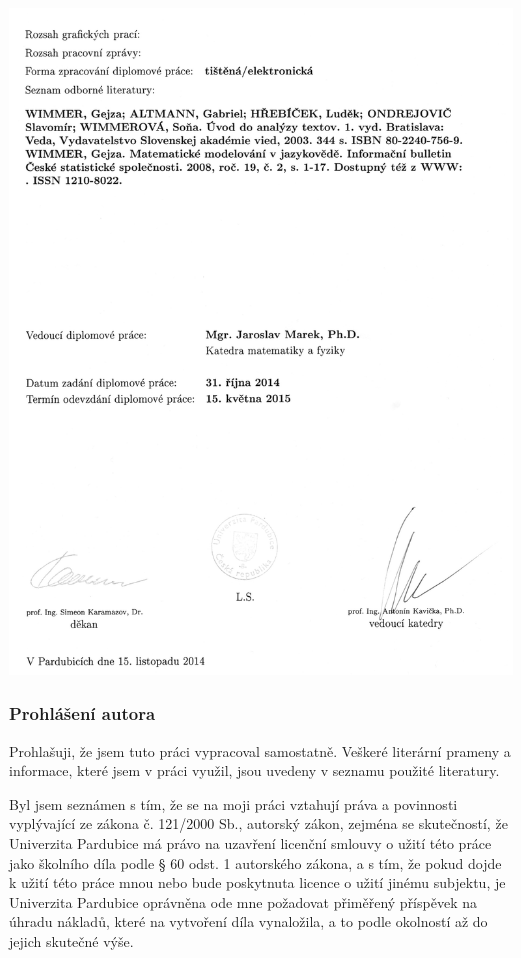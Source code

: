 \documentclass[11pt,a4paper,fleqn,titlepage,twoside,openany,export]{book}
\begin{document}
\newpage 
\thispagestyle{empty}
\begin{center}
\includegraphics[max width=\textwidth,keepaspectratio=true]{imgs-00-zadani/zadani_str_2.png}
\end{center}
\hspace{0pt}

{}

\newpage 
\thispagestyle{empty}
\subsubsection*{Prohlášení autora}

Prohlašuji, že jsem tuto práci vypracoval samostatně. Veškeré literární prameny a informace, které jsem v práci využil, jsou uvedeny v seznamu použité literatury.

Byl jsem seznámen s tím, že se na moji práci vztahují práva a povinnosti vyplývající ze zákona č. 121/2000 Sb., autorský zákon, zejména se skutečností, že Univerzita Pardubice má právo na uzavření licenční smlouvy o užití této práce jako školního díla podle § 60 odst. 1 autorského zákona, a s tím, že pokud dojde k užití této práce mnou nebo bude poskytnuta licence o užití jinému subjektu, je Univerzita Pardubice oprávněna ode mne požadovat přiměřený příspěvek na úhradu nákladů, které na vytvoření díla vynaložila, a to podle okolností až do jejich skutečné výše.
\end{document}
